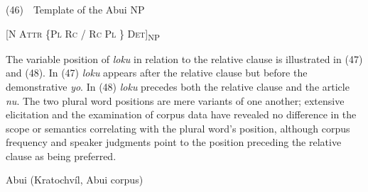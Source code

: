 (46)\ \ Template of the Abui NP

[\textsc{N  Attr  \{Pl  Rc  /  Rc  Pl \} Det}]\textsubscript{NP}

The variable position of \textit{loku }in relation to the relative clause is illustrated in (47) and (48). In (47) \textit{loku} appears after the relative clause but before the demonstrative \textit{yo}. In (48) \textit{loku} precedes both the relative clause and the article \textit{nu}. The two plural word positions are mere variants of one another; extensive elicitation and the examination of corpus data have revealed no difference in the scope or semantics correlating with the plural word{\textquoteright}s position, although corpus frequency and speaker judgments point to the position preceding the relative clause as being preferred. 

Abui (Kratochv\'il, Abui corpus)


